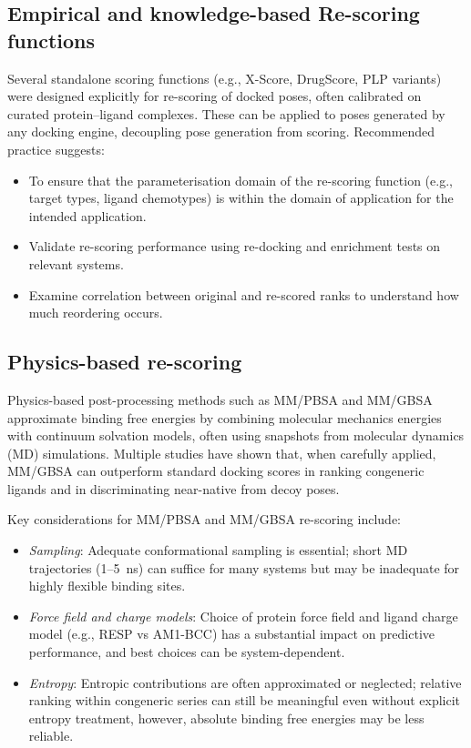 \documentclass[12pt]{article}
\begin{document}
\subsection{Empirical and knowledge-based Re-scoring functions}

Several standalone scoring functions (e.g., X-Score, DrugScore, PLP variants) were designed explicitly for re-scoring of docked poses, often calibrated on curated protein–ligand complexes\cite{CH8_Cheng2009}. These can be applied to poses generated by any docking engine, decoupling pose generation from scoring.
Recommended practice suggests:

\begin{itemize}
  \item To ensure that the parameterisation domain of the re-scoring function (e.g., target types, ligand chemotypes) is within the domain of application for the intended application.
  \item Validate re-scoring performance using re-docking and enrichment tests on relevant systems.
  \item Examine correlation between original and re-scored ranks to understand how much reordering occurs.
\end{itemize}

\subsection{Physics-based re-scoring}

Physics-based post-processing methods such as MM/PBSA and MM/GBSA approximate binding free energies by combining molecular mechanics energies with continuum solvation models, often using snapshots from molecular dynamics (MD) simulations\cite{CH8_Hou2011,CH8_MMGBSApose2011,CH8_MMGBSAreview2015}. Multiple studies have shown that, when carefully applied, MM/GBSA can outperform standard docking scores in ranking congeneric ligands and in discriminating near-native from decoy poses\cite{CH8_Hou2011,CH8_MMGBSApose2011,CH8_MMGBSAffinity2016,CH8_Xu2013}.

Key considerations for MM/PBSA and MM/GBSA re-scoring include:

\begin{itemize}
  \item \emph{Sampling}: Adequate conformational sampling is essential; short MD trajectories (1–5~ns) can suffice for many systems but may be inadequate for highly flexible binding sites\cite{CH8_Hou2011,CH8_Xu2013}.
  \item \emph{Force field and charge models}: Choice of protein force field and ligand charge model (e.g., RESP vs AM1-BCC) has a substantial impact on predictive performance, and best choices can be system-dependent\cite{CH8_Xu2013,CH8_MMGBSAreview2015}.
  \item \emph{Entropy}: Entropic contributions are often approximated or neglected; relative ranking within congeneric series can still be meaningful even without explicit entropy treatment, however, absolute binding free energies may be less reliable.
\end{itemize}
\end{document}
